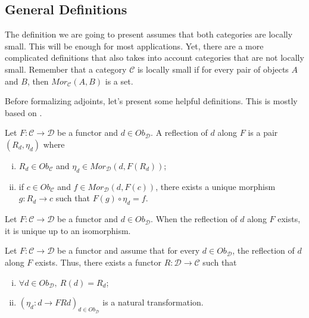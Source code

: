 

\subsection{General Definitions}

The definition we are going to present assumes that both categories are locally small. This will
be enough for most applications. Yet, there are a more complicated definitions that also takes into
account categories that are not locally small. Remember that a category $\mathcal C$
is locally small if for every pair of objects $A$ and $B$, then $Mor_\mathcal C (A,B)$ is a set.

Before formalizing adjoints, let's present some helpful definitions. This is mostly based
on \citet{borceux1994handbook}.

\begin{definition}[Reflection]
	Let $F:\mathcal C \to \mathcal D$ be a functor and $d \in Ob_\mathcal D$.
	A reflection of $d$ along $F$ is a pair $(R_d, \eta_d)$ where
	\begin{enumerate}[(i)]
		\item $R_d \in Ob_\mathcal C$ and $\eta_d \in Mor_{\mathcal D}(d, F(R_d))$;
		\item if $c \in Ob_\mathcal C$ and $f \in Mor_{\mathcal D}(d,F(c))$, there exists
		      a unique morphism $g:R_d \to c$ such that
		      $F(g) \circ \eta_d = f$.
	\end{enumerate}
\end{definition}

\begin{proposition}
	Let $F:\mathcal C \to \mathcal D$ be a functor and $d \in Ob_\mathcal D$.
	When the reflection of $d$ along $F$ exists, it is unique up to an isomorphism.
\end{proposition}

\begin{proposition}
	Let $F:\mathcal C \to \mathcal D$ be a functor and assume that for every
	$d \in Ob_\mathcal D$, the reflection of $d$ along $F$ exists. Thus, there
	exists a functor $R:\mathcal D \to \mathcal C$ such that
	\begin{enumerate}[(i)]
		\item $\forall d \in Ob_\mathcal D, \ R(d) = R_d$;
		\item $(\eta_d:d \to FRd)_{d \in Ob_\mathcal D}$ is a natural transformation.
	\end{enumerate}
\end{proposition}

